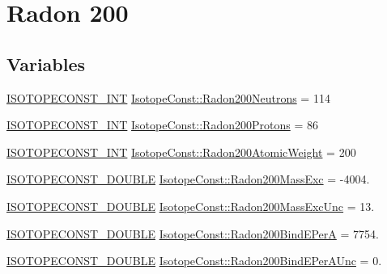 \hypertarget{group___isotope_const-_radon-_rn200}{}\section{Radon 200}
\label{group___isotope_const-_radon-_rn200}
\subsection*{Variables}
\begin{DoxyCompactItemize}
\item 
\mbox{\hyperlink{group___isotope_const-_macros_ga5f18360b3e99483a35c32d789e62621c}{I\+S\+O\+T\+O\+P\+E\+C\+O\+N\+S\+T\+\_\+\+I\+NT}} \mbox{\hyperlink{group___isotope_const-_radon-_rn200_gae0f61e5effd7f0e71da374b860bb7436}{Isotope\+Const\+::\+Radon200\+Neutrons}} = 114
\item 
\mbox{\hyperlink{group___isotope_const-_macros_ga5f18360b3e99483a35c32d789e62621c}{I\+S\+O\+T\+O\+P\+E\+C\+O\+N\+S\+T\+\_\+\+I\+NT}} \mbox{\hyperlink{group___isotope_const-_radon-_rn200_gac7605c93384b29029125a5344c9df7c3}{Isotope\+Const\+::\+Radon200\+Protons}} = 86
\item 
\mbox{\hyperlink{group___isotope_const-_macros_ga5f18360b3e99483a35c32d789e62621c}{I\+S\+O\+T\+O\+P\+E\+C\+O\+N\+S\+T\+\_\+\+I\+NT}} \mbox{\hyperlink{group___isotope_const-_radon-_rn200_ga0e5f3a367c5238206fc99acc4b6e08d9}{Isotope\+Const\+::\+Radon200\+Atomic\+Weight}} = 200
\item 
\mbox{\hyperlink{group___isotope_const-_macros_ga8f45a7272ce02c0b4c65c44636ed719a}{I\+S\+O\+T\+O\+P\+E\+C\+O\+N\+S\+T\+\_\+\+D\+O\+U\+B\+LE}} \mbox{\hyperlink{group___isotope_const-_radon-_rn200_ga7543768450c8bb9c61bf6d7fddb0daa5}{Isotope\+Const\+::\+Radon200\+Mass\+Exc}} = -\/4004.
\item 
\mbox{\hyperlink{group___isotope_const-_macros_ga8f45a7272ce02c0b4c65c44636ed719a}{I\+S\+O\+T\+O\+P\+E\+C\+O\+N\+S\+T\+\_\+\+D\+O\+U\+B\+LE}} \mbox{\hyperlink{group___isotope_const-_radon-_rn200_gaab0344a848ea9441b5640aee6b532900}{Isotope\+Const\+::\+Radon200\+Mass\+Exc\+Unc}} = 13.
\item 
\mbox{\hyperlink{group___isotope_const-_macros_ga8f45a7272ce02c0b4c65c44636ed719a}{I\+S\+O\+T\+O\+P\+E\+C\+O\+N\+S\+T\+\_\+\+D\+O\+U\+B\+LE}} \mbox{\hyperlink{group___isotope_const-_radon-_rn200_gaab3077d85f0ec22f05f4ef21d71c7577}{Isotope\+Const\+::\+Radon200\+Bind\+E\+PerA}} = 7754.
\item 
\mbox{\hyperlink{group___isotope_const-_macros_ga8f45a7272ce02c0b4c65c44636ed719a}{I\+S\+O\+T\+O\+P\+E\+C\+O\+N\+S\+T\+\_\+\+D\+O\+U\+B\+LE}} \mbox{\hyperlink{group___isotope_const-_radon-_rn200_ga5035656b831c31b29a0bfd8e131ad266}{Isotope\+Const\+::\+Radon200\+Bind\+E\+Per\+A\+Unc}} = 0.

\end{DoxyCompactItemize}
